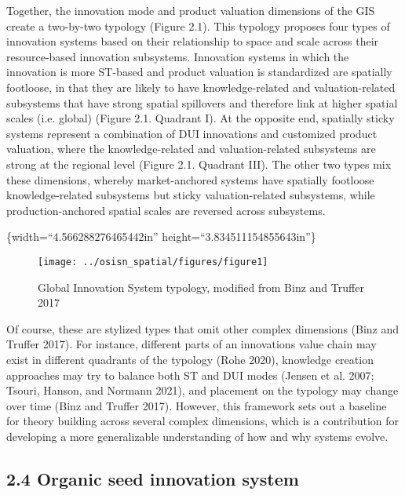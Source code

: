 \documentclass[twoside,12pt,final]{ucthesis-CA2012}
\begin{document}
\begin{ucmainmatter}
Together, the innovation mode and product valuation dimensions of the
GIS create a two-by-two typology (Figure 2.1). This typology proposes
four types of innovation systems based on their relationship to space
and scale across their resource-based innovation subsystems. Innovation
systems in which the innovation is more ST-based and product valuation
is standardized are \textquotesingle spatially footloose\textquotesingle, in that they are likely to
have knowledge-related and valuation-related subsystems that have strong
spatial spillovers and therefore link at higher spatial scales (i.e.
\textquotesingle global\textquotesingle) (Figure 2.1. Quadrant I). At the opposite end, \textquotesingle spatially
sticky\textquotesingle{} systems represent a combination of DUI innovations and
customized product valuation, where the knowledge-related and
valuation-related subsystems are strong at the regional level (Figure
2.1. Quadrant III). The other two types mix these dimensions, whereby
\textquotesingle market-anchored\textquotesingle{} systems have spatially footloose knowledge-related
subsystems but sticky valuation-related subsystems, while
\textquotesingle production-anchored\textquotesingle{} spatial scales are reversed across subsystems.

\{width=``4.566288276465442in''
height=``3.834511154855643in''\}
\begin{figure}

{\centering \texttt{[image: ../osisn\_spatial/figures/figure1]} 

}

\caption{Global Innovation System typology, modified from Binz and Truffer 2017}\label{fig:unnamed-chunk-14}
\end{figure}
Of course, these are stylized types that omit other complex dimensions
(Binz and Truffer 2017).
For instance, different parts of an innovation\textquotesingle s value chain may exist
in different quadrants of the typology (Rohe
2020), knowledge creation
approaches may try to balance both ST and DUI modes (Jensen et al.
2007; Tsouri, Hanson, and Normann
2021), and placement on the
typology may change over time (Binz and Truffer
2017). However, this
framework sets out a baseline for theory building across several complex
dimensions, which is a contribution for developing a more generalizable
understanding of how and why systems evolve.

\hypertarget{organic-seed-innovation-system}{%
\subsection{2.4 Organic seed innovation system}\label{organic-seed-innovation-system}}


\end{ucmainmatter}
\end{document}
